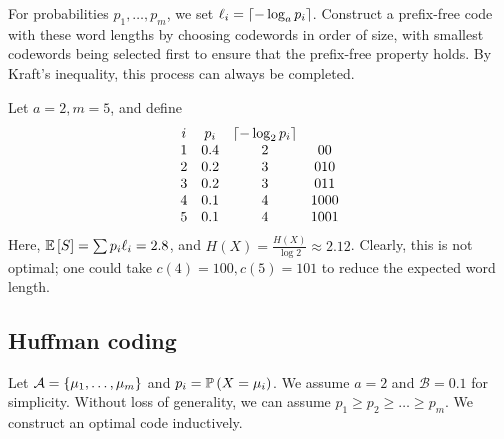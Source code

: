\begin{example}
    For probabilities \( p_1, \dots, p_m \), we set \( \ell_i = \lceil-\log_a p_i\rceil \).
    Construct a prefix-free code with these word lengths by choosing codewords in order of size, with smallest codewords being selected first to ensure that the prefix-free property holds.
    By Kraft's inequality, this process can always be completed.
\end{example}
\begin{example}
    Let \( a = 2, m = 5 \), and define
    \[ \begin{array}{cccc}
            i & p_i & \lceil-\log_2 p_i\rceil \\
            1 & 0.4 & 2 & 00 \\
            2 & 0.2 & 3 & 010 \\
            3 & 0.2 & 3 & 011 \\
            4 & 0.1 & 4 & 1000 \\
            5 & 0.1 & 4 & 1001
    \end{array} \]
    Here, \( \mathbb{E}\left[{S}\right] = \sum p_i \ell_i = 2.8 \), and \( H(X) = \frac{H(X)}{\log 2} \approx 2.12 \).
    Clearly, this is not optimal; one could take \( c(4) = 100, c(5) = 101 \) to reduce the expected word length.
\end{example}

\subsection{Huffman coding}
Let \( \mathcal A = \qty{\mu_1, \dots, \mu_m} \) and \( p_i = \mathbb{P}\left({X = \mu_i}\right) \).
We assume \( a = 2 \) and \( \mathcal B = \qty{0,1} \) for simplicity.
Without loss of generality, we can assume \( p_1 \geq p_2 \geq \dots \geq p_m \).
We construct an optimal code inductively.

